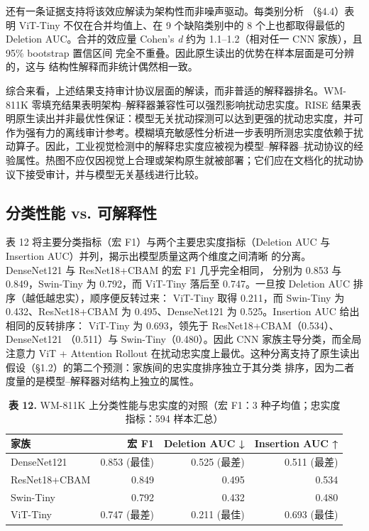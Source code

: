 \documentclass[11pt,a4paper]{article}
\begin{document}
还有一条证据支持将该效应解读为架构性而非噪声驱动。每类别分析 （§4.4）表明 ViT-Tiny 不仅在合并均值上、在 9 个缺陷类别中的 8 个上也都取得最低的 Deletion AUC。合并的效应量 Cohen's \emph{d} 约为 1.1–1.2（相对任一 CNN 家族），且 95\% bootstrap 置信区间 完全不重叠。因此原生读出的优势在样本层面是可分辨的，这与 结构性解释而非统计偶然相一致。

综合来看，上述结果支持审计协议层面的解读，而非普适的解释器排名。WM-811K 零填充结果表明架构–解释器兼容性可以强烈影响扰动忠实度。RISE 结果表明原生读出并非最优性保证：模型无关扰动探测可以达到更强的扰动忠实度，并可作为强有力的离线审计参考。模糊填充敏感性分析进一步表明所测忠实度依赖于扰动算子。因此，工业视觉检测中的解释忠实度应被视为模型–解释器–扰动协议的经验属性。热图不应仅因视觉上合理或架构原生就被部署；它们应在文档化的扰动协议下接受审计，并与模型无关基线进行比较。

\subsection{分类性能 vs. 可解释性}

表 12 将主要分类指标（宏 F1）与两个主要忠实度指标（Deletion AUC 与 Insertion AUC）并列，揭示出模型质量这两个维度之间清晰 的分离。DenseNet121 与 ResNet18+CBAM 的宏 F1 几乎完全相同， 分别为 0.853 与 0.849，Swin-Tiny 为 0.792，而 ViT-Tiny 落后至 0.747。一旦按 Deletion AUC 排序（越低越忠实），顺序便反转过来： ViT-Tiny 取得 0.211，而 Swin-Tiny 为 0.432、ResNet18+CBAM 为 0.495、DenseNet121 为 0.525。Insertion AUC 给出相同的反转排序： ViT-Tiny 为 0.693，领先于 ResNet18+CBAM（0.534）、DenseNet121 （0.511）与 Swin-Tiny（0.480）。因此 CNN 家族主导分类，而全局 注意力 ViT + Attention Rollout 在扰动忠实度上最优。这种分离支持了原生读出 假设（§1.2）的第二个预测：家族间的忠实度排序独立于其分类 排序，因为二者度量的是模型–解释器对结构上独立的属性。

\begin{table}[htbp]
\centering
\small
\caption{\textbf{表 12.} WM-811K 上分类性能与忠实度的对照（宏 F1：3 种子均值；忠实度指标：594 样本汇总）}
\begin{tabular}{lrrr}
\toprule
家族 & 宏 F1 & Deletion AUC ↓ & Insertion AUC ↑ \\
\midrule
DenseNet121 & 0.853 (最佳) & 0.525 (最差) & 0.511 (最差) \\
ResNet18+CBAM & 0.849 & 0.495 & 0.534 \\
Swin-Tiny & 0.792 & 0.432 & 0.480 \\
ViT-Tiny & 0.747 (最差) & 0.211 (最佳) & 0.693 (最佳) \\
\bottomrule
\end{tabular}
\end{table}
\end{document}
